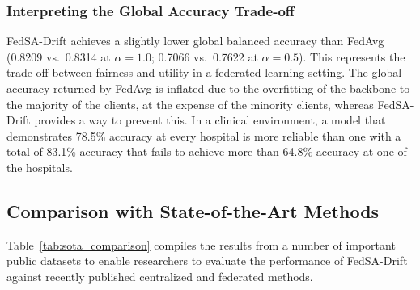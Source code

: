 \documentclass{ieeeaccess}
\newcommand{\sadrift}{FedSA-Drift}
\begin{document}
\subsubsection{Interpreting the Global Accuracy Trade-off}

\sadrift{} achieves a slightly lower global balanced accuracy than FedAvg (0.8209 vs.\ 0.8314 at $\alpha{=}1.0$; 0.7066 vs.\ 0.7622 at $\alpha{=}0.5$). This represents the trade-off between fairness and utility in a federated learning setting. The global accuracy returned by FedAvg is inflated due to the overfitting of the backbone to the majority of the clients, at the expense of the minority clients, whereas \sadrift{} provides a way to prevent this. In a clinical environment, a model that demonstrates 78.5\% accuracy at every hospital is more reliable than one with a total of 83.1\% accuracy that fails to achieve more than 64.8\% accuracy at one of the hospitals.

\subsection{Comparison with State-of-the-Art Methods}
\label{sec:sota_comparison}

Table~\ref{tab:sota_comparison} compiles the results from a number of important public datasets to enable researchers to evaluate the performance of \sadrift{} against recently published centralized and federated methods.
\end{document}
